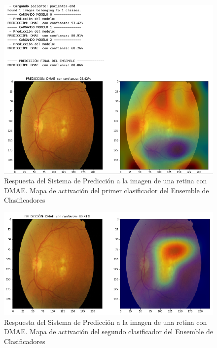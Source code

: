 \documentclass[
  12pt,
  spanish,
  a4paperpaper,
]{report}
\begin{document}
\begin{figure}
\centering
\includegraphics[width=1\textwidth,height=\textheight]{source/figures/pred5.png}
\caption{Respuesta del Sistema de Predicción a la imagen de una retina
con DMAE. Mapa de activación del primer clasificador del Ensemble de
Clasificadores \label{pred5}}
\end{figure}

\begin{figure}
\centering
\includegraphics[width=1\textwidth,height=\textheight]{source/figures/pred6.png}
\caption{Respuesta del Sistema de Predicción a la imagen de una retina
con DMAE. Mapa de activación del segundo clasificador del Ensemble de
Clasificadores \label{pred6}}
\end{figure}
\end{document}
